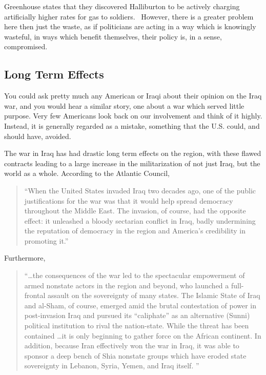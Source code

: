 \documentclass[12pt, draft]{article}
\begin{document}
        Greenhouse states that they discovered Halliburton to be actively charging artificially higher rates for gas to soldiers.~\parencite{nytimes2005halliburtoncontract} However, there is a greater problem here then just the waste, as if politicians are acting in a way which is knowingly wasteful, in ways which benefit themselves, their policy is, in a sense, compromised. 

        
     \subsection{Long Term Effects}   
        You could ask pretty much any American or Iraqi about their opinion on the Iraq war, and you would hear a similar story, one about a war which served little purpose. \parencite{igielnik2019wars} Very few Americans look back on our involvement and think of it highly. Instead, it is generally regarded as a mistake, something that the U.S. could, and should have, avoided.

        The war in Iraq has had drastic long term effects on the region, with these flawed contracts leading to a large increase in the militarization of not just Iraq, but the world as a whole. According to the Atlantic Council,

        \begin{quotation}
            ``When the United States invaded Iraq two decades ago, one of the public justifications for the war was that it would help spread democracy throughout the Middle East. The invasion, of course, had the opposite effect: it unleashed a bloody sectarian conflict in Iraq, badly undermining the reputation of democracy in the region and America's credibility in promoting it.'' \parencite{atlanticcouncil_iraqwar2023}
        \end{quotation}

        Furthermore, 

        \begin{quotation}
            ``\ldots the consequences of the war led to the spectacular empowerment of armed nonstate actors in the region and beyond, who launched a full-frontal assault on the sovereignty of many states. The Islamic State of Iraq and al-Sham, of course, emerged amid the brutal contestation of power in post-invasion Iraq and pursued its “caliphate” as an alternative (Sunni) political institution to rival the nation-state. While the threat has been contained \ldots it is only beginning to gather force on the African continent. In addition, because Iran effectively won the war in Iraq, it was able to sponsor a deep bench of Shia nonstate groups which have eroded state sovereignty in Lebanon, Syria, Yemen, and Iraq itself. '' \parencite{atlanticcouncil_iraqwar2023}
        \end{quotation}
\end{document}
